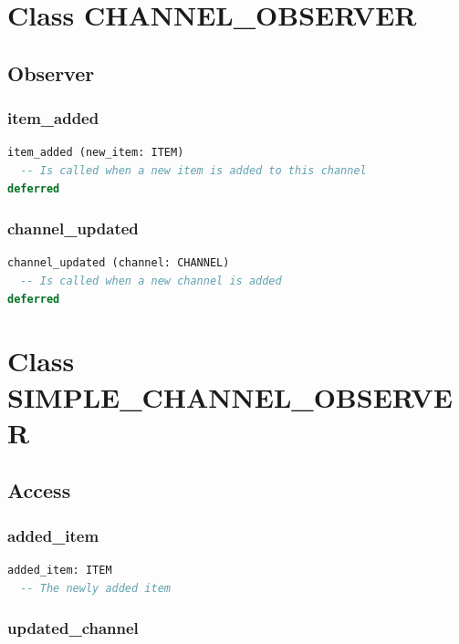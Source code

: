 \section{Class CHANNEL\_OBSERVER}
\label{sec:feed-observer}

\subsection{Observer}
\label{sec:feed-channel-observer-observer}

\subsubsection{item\_added}

\begin{lstlisting}[language=Eiffel]
item_added (new_item: ITEM)
  -- Is called when a new item is added to this channel
deferred
\end{lstlisting}

\subsubsection{channel\_updated}

\begin{lstlisting}[language=Eiffel]
channel_updated (channel: CHANNEL)
  -- Is called when a new channel is added
deferred
\end{lstlisting}


\section{Class SIMPLE\_CHANNEL\_OBSERVER}
\label{sec:feed-channel-observer}

\subsection{Access}
\label{sec:feed-simple-channel-observer-access}

\subsubsection{added\_item}

\begin{lstlisting}[language=Eiffel]
added_item: ITEM
  -- The newly added item
\end{lstlisting}

\subsubsection{updated\_channel}

